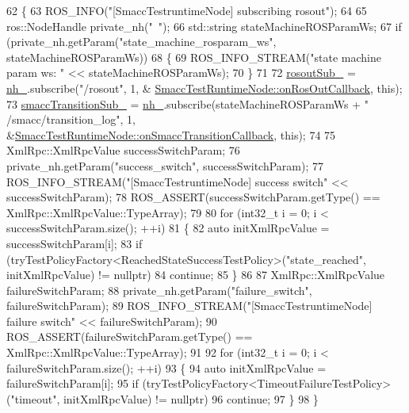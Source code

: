 \begin{DoxyCode}
62   \{
63     ROS\_INFO(\textcolor{stringliteral}{"[SmaccTestruntimeNode] subscribing rosout"});
64 
65     ros::NodeHandle private\_nh(\textcolor{stringliteral}{"~"});
66     std::string stateMachineROSParamWs;
67     \textcolor{keywordflow}{if} (private\_nh.getParam(\textcolor{stringliteral}{"state\_machine\_rosparam\_ws"}, stateMachineROSParamWs))
68     \{
69       ROS\_INFO\_STREAM(\textcolor{stringliteral}{"state machine param ws: "} << stateMachineROSParamWs);
70     \}
71 
72     \hyperlink{classSmaccTestRuntimeNode_a88121fc45189308d50f49c950461e1f8}{rosoutSub\_} = \hyperlink{classSmaccTestRuntimeNode_a7521807a7f051ca753672ee459f93d4a}{nh\_}.subscribe(\textcolor{stringliteral}{"/rosout"}, 1, &
      \hyperlink{classSmaccTestRuntimeNode_a9d03a2f6a41e75c488f932b7efcb1292}{SmaccTestRuntimeNode::onRosOutCallback}, \textcolor{keyword}{this});
73     \hyperlink{classSmaccTestRuntimeNode_a8cd8b97668759afd45898951011487d0}{smaccTransitionSub\_} = \hyperlink{classSmaccTestRuntimeNode_a7521807a7f051ca753672ee459f93d4a}{nh\_}.subscribe(stateMachineROSParamWs + \textcolor{stringliteral}{"
      /smacc/transition\_log"}, 1, &\hyperlink{classSmaccTestRuntimeNode_a09b21826547d6ac7de6049611bb1cde8}{SmaccTestRuntimeNode::onSmaccTransitionCallback}, \textcolor{keyword}{
      this});
74 
75     XmlRpc::XmlRpcValue successSwitchParam;
76     private\_nh.getParam(\textcolor{stringliteral}{"success\_switch"}, successSwitchParam);
77     ROS\_INFO\_STREAM(\textcolor{stringliteral}{"[SmaccTestruntimeNode] success switch"} << successSwitchParam);
78     ROS\_ASSERT(successSwitchParam.getType() == XmlRpc::XmlRpcValue::TypeArray);
79 
80     \textcolor{keywordflow}{for} (int32\_t i = 0; i < successSwitchParam.size(); ++i)
81     \{
82       \textcolor{keyword}{auto} initXmlRpcValue = successSwitchParam[i];
83       \textcolor{keywordflow}{if} (tryTestPolicyFactory<ReachedStateSuccessTestPolicy>(\textcolor{stringliteral}{"state\_reached"}, initXmlRpcValue) != \textcolor{keyword}{nullptr})
84         \textcolor{keywordflow}{continue};
85     \}
86 
87     XmlRpc::XmlRpcValue failureSwitchParam;
88     private\_nh.getParam(\textcolor{stringliteral}{"failure\_switch"}, failureSwitchParam);
89     ROS\_INFO\_STREAM(\textcolor{stringliteral}{"[SmaccTestruntimeNode] failure switch"} << failureSwitchParam);
90     ROS\_ASSERT(failureSwitchParam.getType() == XmlRpc::XmlRpcValue::TypeArray);
91 
92     \textcolor{keywordflow}{for} (int32\_t i = 0; i < failureSwitchParam.size(); ++i)
93     \{
94       \textcolor{keyword}{auto} initXmlRpcValue = failureSwitchParam[i];
95       \textcolor{keywordflow}{if} (tryTestPolicyFactory<TimeoutFailureTestPolicy>(\textcolor{stringliteral}{"timeout"}, initXmlRpcValue) != \textcolor{keyword}{nullptr})
96         \textcolor{keywordflow}{continue};
97     \}
98   \}
\end{DoxyCode}
